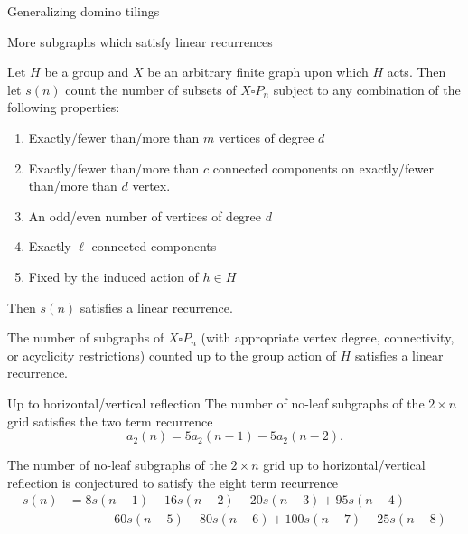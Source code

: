 \documentclass{beamer}%
\begin{document}
\begin{frame}{Generalizing domino tilings}

\end{frame}

\begin{frame}{More subgraphs which satisfy linear recurrences}
  \begin{theorem}
    Let $H$ be a group and $X$ be an arbitrary finite graph upon which $H$ acts.
    Then let $s(n)$ count the number of subsets of
    $X \square P_n$ subject to any combination of the following properties:
    \begin{enumerate}
      \item Exactly/fewer than/more than $m$ vertices of degree $d$
      \item Exactly/fewer than/more than $c$ connected components on
        exactly/fewer than/more than $d$ vertex.
      \item An odd/even number of vertices of degree $d$
      \item Exactly $\ell$ connected components
      \item Fixed by the induced action of $h \in H$
    \end{enumerate}
    Then $s(n)$ satisfies a linear recurrence.
  \end{theorem}
  \begin{corollary}
    The number of subgraphs of $X \square P_n$ (with appropriate vertex degree,
    connectivity, or acyclicity restrictions) counted up to the group action of
    $H$ satisfies a linear recurrence.
  \end{corollary}
\end{frame}

\begin{frame}{Up to horizontal/vertical reflection} %
  The number of no-leaf subgraphs of the $2 \times n$ grid satisfies the two
  term recurrence \[
    a_2(n) = 5a_2(n-1) - 5a_2(n-2).
  \]

  The number of no-leaf subgraphs of the $2 \times n$ grid up to
  horizontal/vertical reflection is conjectured to satisfy the eight term
  recurrence
  \begin{align*}
    s(n) &= 8s(n-1) - 16s(n-2) - 20s(n-3) + 95s(n-4) \\
         &\hspace{1cm}- 60s(n-5) - 80s(n-6) + 100s(n-7) - 25s(n-8)
  \end{align*}
  
\end{frame}
\end{document}
